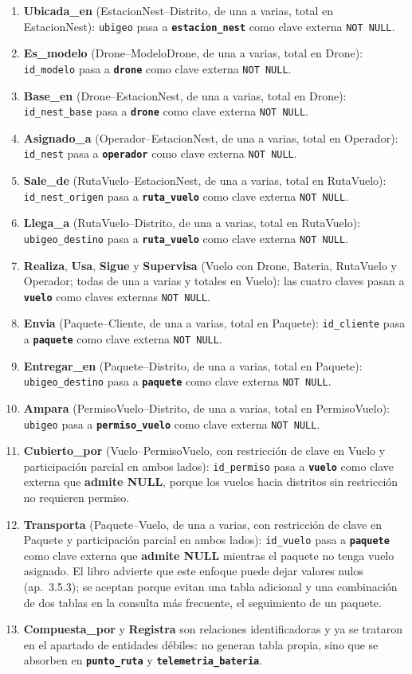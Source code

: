 \documentclass[11pt,a4paper]{article}
\newcommand{\tb}[1]{\textbf{\texttt{#1}}}
\newcommand{\at}[1]{\texttt{#1}}
\begin{document}
\begin{enumerate}[leftmargin=*]
\item \textbf{Ubicada\_en} (EstacionNest--Distrito, de una a varias, total en EstacionNest): \at{ubigeo} pasa a \tb{estacion\_nest} como clave externa \texttt{NOT NULL}.
\item \textbf{Es\_modelo} (Drone--ModeloDrone, de una a varias, total en Drone): \at{id\_modelo} pasa a \tb{drone} como clave externa \texttt{NOT NULL}.
\item \textbf{Base\_en} (Drone--EstacionNest, de una a varias, total en Drone): \at{id\_nest\_base} pasa a \tb{drone} como clave externa \texttt{NOT NULL}.
\item \textbf{Asignado\_a} (Operador--EstacionNest, de una a varias, total en Operador): \at{id\_nest} pasa a \tb{operador} como clave externa \texttt{NOT NULL}.
\item \textbf{Sale\_de} (RutaVuelo--EstacionNest, de una a varias, total en RutaVuelo): \at{id\_nest\_origen} pasa a \tb{ruta\_vuelo} como clave externa \texttt{NOT NULL}.
\item \textbf{Llega\_a} (RutaVuelo--Distrito, de una a varias, total en RutaVuelo): \at{ubigeo\_destino} pasa a \tb{ruta\_vuelo} como clave externa \texttt{NOT NULL}.
\item \textbf{Realiza}, \textbf{Usa}, \textbf{Sigue} y \textbf{Supervisa} (Vuelo con Drone, Bateria, RutaVuelo y Operador; todas de una a varias y totales en Vuelo): las cuatro claves pasan a \tb{vuelo} como claves externas \texttt{NOT NULL}.
\item \textbf{Envia} (Paquete--Cliente, de una a varias, total en Paquete): \at{id\_cliente} pasa a \tb{paquete} como clave externa \texttt{NOT NULL}.
\item \textbf{Entregar\_en} (Paquete--Distrito, de una a varias, total en Paquete): \at{ubigeo\_destino} pasa a \tb{paquete} como clave externa \texttt{NOT NULL}.
\item \textbf{Ampara} (PermisoVuelo--Distrito, de una a varias, total en PermisoVuelo): \at{ubigeo} pasa a \tb{permiso\_vuelo} como clave externa \texttt{NOT NULL}.
\item \textbf{Cubierto\_por} (Vuelo--PermisoVuelo, con restricción de clave en Vuelo y participación parcial en ambos lados): \at{id\_permiso} pasa a \tb{vuelo} como clave externa que \textbf{admite NULL}, porque los vuelos hacia distritos sin restricción no requieren permiso.
\item \textbf{Transporta} (Paquete--Vuelo, de una a varias, con restricción de clave en Paquete y participación parcial en ambos lados): \at{id\_vuelo} pasa a \tb{paquete} como clave externa que \textbf{admite NULL} mientras el paquete no tenga vuelo asignado. El libro advierte que este enfoque puede dejar valores nulos (ap.~3.5.3); se aceptan porque evitan una tabla adicional y una combinación de dos tablas en la consulta más frecuente, el seguimiento de un paquete.
\item \textbf{Compuesta\_por} y \textbf{Registra} son relaciones identificadoras y ya se trataron en el apartado de entidades débiles: no generan tabla propia, sino que se absorben en \tb{punto\_ruta} y \tb{telemetria\_bateria}.
\end{enumerate}
\end{document}
